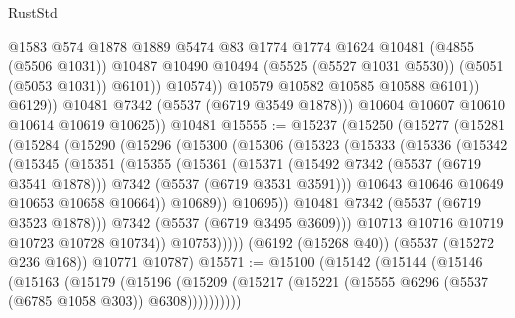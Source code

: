\begin{lexlean}{RustStd}
\begin{coremodule}
                          @1583
                          @574
                          @1878
                          @1889
                          @5474
                          @83
                          @1774
                          @1774
                          @1624
                          @10481
                          (@4855 (@5506 @1031))
                          @10487
                          @10490
                          @10494
                          (@5525 (@5527 @1031 @5530))
                          (@5051 (@5053 @1031))
                          @6101))
                      @10574))
                  @10579
                  @10582
                  @10585
                  @10588
                  @6101))
              @6129))
          @10481
          @7342
          (@5537 (@6719 @3549 @1878)))
        @10604
        @10607
        @10610
        @10614
        @10619
        @10625))
    @10481
@15555 := @15237
    (@15250
      (@15277
        (@15281
          (@15284
            (@15290
              (@15296
                (@15300
                  (@15306
                    (@15323
                      (@15333
                        (@15336
                          (@15342
                            (@15345
                              (@15351
                                (@15355
                                  (@15361
                                    (@15371
                                      (@15492 @7342 (@5537 (@6719 @3541 @1878)))
                                      @7342
                                      (@5537 (@6719 @3531 @3591)))
                                    @10643
                                    @10646
                                    @10649
                                    @10653
                                    @10658
                                    @10664))
                                @10689))
                            @10695))
                        @10481
                        @7342
                        (@5537 (@6719 @3523 @1878)))
                      @7342
                      (@5537 (@6719 @3495 @3609)))
                    @10713
                    @10716
                    @10719
                    @10723
                    @10728
                    @10734))
                @10753)))))
      (@6192 (@15268 @40))
      (@5537 (@15272 @236 @168))
      @10771
      @10787)
@15571 := @15100
    (@15142
      (@15144
        (@15146
          (@15163
            (@15179
              (@15196
                (@15209 (@15217 (@15221 (@15555 @6296 (@5537 (@6785 @1058 @303)) @6308))))))))))

\end{coremodule}
\end{lexlean}
